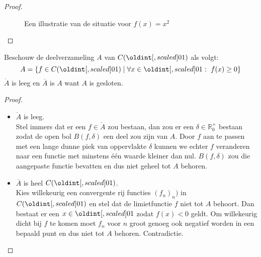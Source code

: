\documentclass[main.tex]{subfiles}
\begin{document}
\begin{vb}
\begin{proof}
\begin{itemize}
\begin{figure}[H]
      \caption{ Een illustratie van de situatie voor $f(x) = x^{2}$}
    \end{figure}
    \end{itemize}
  \end{proof}
\end{vb}

\begin{vb}
  Beschouw de deelverzameling $A$ van $C(\interval{0}{1})$ als volgt:
  \[ A = \left\{ f \in C(\interval{0}{1}) \mid \forall x\in \interval{0}{1}:\ f(x) \ge 0 \right\} \]
  $\mathring{A}$ is leeg en $\overline{A}$ is $A$ want $A$ is gesloten.

  \begin{proof}
    \noindent
    \begin{itemize}
    \item $\mathring{A}$ is leeg.\\
      Stel immers dat er een $f\in \mathring{A}$ zou bestaan, dan zou er een $\delta \in \mathbb{R}_{0}^{+}$ bestaan zodat de open bol $B(f,\delta)$ een deel zou zijn van $A$.
      Door $f$ aan te passen met een lange dunne piek van oppervlakte $\delta$ kunnen we echter $f$ veranderen naar een functie met minstens \'e\'en waarde kleiner dan nul.
      $B(f,\delta)$ zou die aangepaste functie bevatten en dus niet geheel tot $A$ behoren.
    \item $\overline{A}$ is heel $C(\interval{0}{1})$.\\
      Kies willekeurig een convergente rij functies $(f_{n})_{n})$ in $C(\interval{0}{1})$ en stel dat de limietfunctie $f$ niet tot $A$ behoort.
      Dan bestaat er een $x\in\interval{0}{1}$ zodat $f(x)<0$ geldt.
      Om willekeurig dicht bij $f$ te komen moet $f_{n}$ voor $n$ groot genoeg ook negatief worden in een bepaald punt en dus niet tot $A$ behoren.
      Contradictie.
    \end{itemize}
  \end{proof}
\end{vb}
\end{document}
